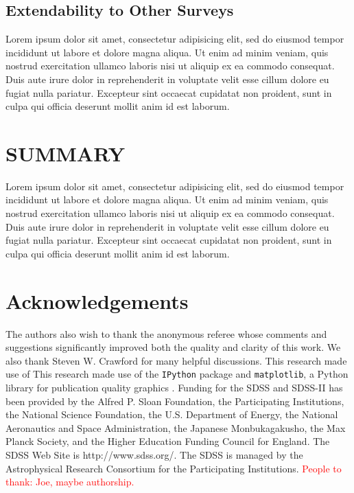 \documentclass[fleqn,usenatbib]{mnras}
\newcommand{\editorial}[1]{\textcolor{red}{#1}}
\begin{document}
\subsection{Extendability to Other Surveys}
Lorem ipsum dolor sit amet, consectetur adipisicing elit, sed do eiusmod tempor incididunt ut labore et dolore magna aliqua. Ut enim ad minim veniam, quis nostrud exercitation ullamco laboris nisi ut aliquip ex ea commodo consequat. Duis aute irure dolor in reprehenderit in voluptate velit esse cillum dolore eu fugiat nulla pariatur. Excepteur sint occaecat cupidatat non proident, sunt in culpa qui officia deserunt mollit anim id est laborum.

\section{SUMMARY}
Lorem ipsum dolor sit amet, consectetur adipisicing elit, sed do eiusmod tempor incididunt ut labore et dolore magna aliqua. Ut enim ad minim veniam, quis nostrud exercitation ullamco laboris nisi ut aliquip ex ea commodo consequat. Duis aute irure dolor in reprehenderit in voluptate velit esse cillum dolore eu fugiat nulla pariatur. Excepteur sint occaecat cupidatat non proident, sunt in culpa qui officia deserunt mollit anim id est laborum.

\section*{Acknowledgements}
The authors also wish to thank the anonymous referee whose comments and suggestions significantly improved both the quality and clarity of this work. We also thank Steven W. Crawford for many helpful discussions. This research made use of This research made use of  the {\tt IPython} package \citep{Perez2007} and {\tt matplotlib}, a Python library for publication quality graphics \citep{Hunter2007}. Funding for the SDSS and SDSS-II has been provided by the Alfred P. Sloan Foundation, the Participating Institutions, the National Science Foundation, the U.S. Department of Energy, the National Aeronautics and Space Administration, the Japanese Monbukagakusho, the Max Planck Society, and the Higher Education Funding Council for England. The SDSS Web Site is http://www.sdss.org/. The SDSS is managed by the Astrophysical Research Consortium for the Participating Institutions. \editorial{People to thank: Joe, maybe authorship.}



%
%

\bsp	%
\label{lastpage}
\end{document}
